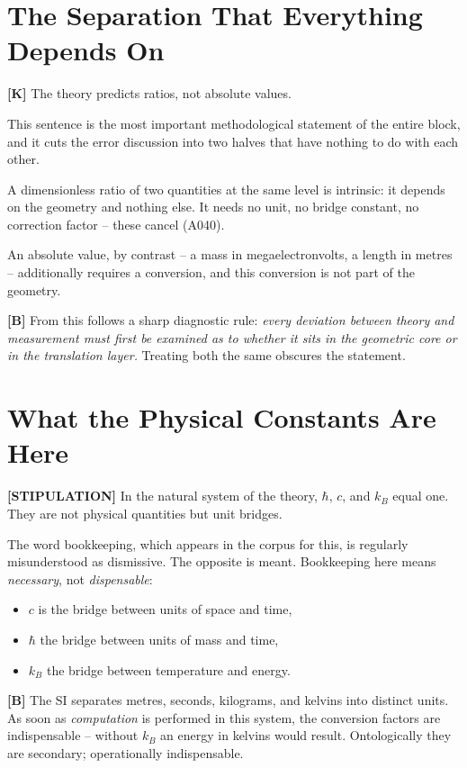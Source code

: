 \section{The Separation That Everything Depends On}

\textbf{[K]} The theory predicts ratios, not absolute values.

This sentence is the most important methodological statement of the entire
block, and it cuts the error discussion into two halves that have nothing to
do with each other.

A dimensionless ratio of two quantities at the same level is intrinsic: it
depends on the geometry and nothing else. It needs no unit, no bridge constant,
no correction factor -- these cancel (A040).

An absolute value, by contrast -- a mass in megaelectronvolts, a length in
metres -- additionally requires a conversion, and this conversion is not part
of the geometry.

\textbf{[B]} From this follows a sharp diagnostic rule: \emph{every deviation
between theory and measurement must first be examined as to whether it sits in
the geometric core or in the translation layer.} Treating both the same obscures
the statement.

\section{What the Physical Constants Are Here}

\textbf{[STIPULATION]} In the natural system of the theory, $\hbar$, $c$, and
$k_B$ equal one. They are not physical quantities but unit bridges.

The word bookkeeping, which appears in the corpus for this, is regularly
misunderstood as dismissive. The opposite is meant. Bookkeeping here means
\emph{necessary}, not \emph{dispensable}:

\begin{itemize}
  \item $c$ is the bridge between units of space and time,
  \item $\hbar$ the bridge between units of mass and time,
  \item $k_B$ the bridge between temperature and energy.
\end{itemize}

\textbf{[B]} The SI separates metres, seconds, kilograms, and kelvins into
distinct units. As soon as \emph{computation} is performed in this system, the
conversion factors are indispensable -- without $k_B$ an energy in kelvins would
result. Ontologically they are secondary; operationally indispensable.

